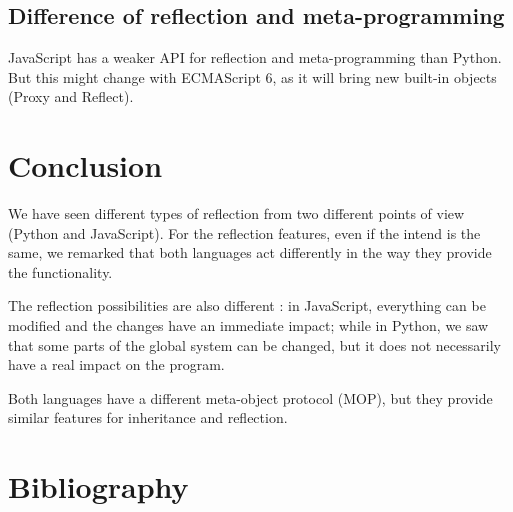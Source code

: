 \documentclass[a4paper,10pt]{article}
\begin{document}
\subsection{Difference of reflection and meta-programming}

JavaScript has a weaker API for reflection and meta-programming than Python. But this might change with ECMAScript 6, as it will bring new built-in objects (Proxy and Reflect).


\section{Conclusion}

We have seen different types of reflection from two different points of view (Python and JavaScript).
For the reflection features, even if the intend is the same, we remarked that both languages act differently in the way they provide the functionality.

The reflection possibilities are also different : in JavaScript, everything can be modified and the changes have an immediate impact; while in Python, we saw that some parts of the global system can be changed, but it does not necessarily have a real impact on the program.

Both languages have a different meta-object protocol (MOP), but they provide similar features for inheritance and reflection.


\section{Bibliography}



\end{document}
